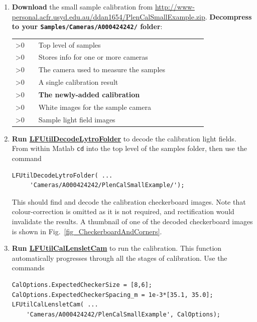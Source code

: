 \documentclass[onecolumn]{article}
\makeatletter
\newcommand{\Repeat}[1]{%
    \expandafter\@Repeat\expandafter{\the\numexpr #1\relax}%
}
\def\@Repeat#1{%
    \ifnum#1>0
        \expandafter\@@Repeat\expandafter{\the\numexpr #1-1\expandafter\relax\expandafter}%
    \else
        \expandafter\@gobble
    \fi
}
\def\@@Repeat#1#2{%
    \@Repeat{#1}{#2}#2%
}
\newcommand{\CiteFunction}[1]{\hyperlink{#1}{\small #1}}
\newcommand{\NewAnnotatedTree}[1]{\vspace{1em}\noindent\begin{tabular}{*{#1}{p{0.1em}}cp{6.5cm}}}
\newcommand{\EndAnnotatedTree}{\end{tabular}\vspace{1em}}
\newcommand{\AnnotatedTreeEntry}[4]{\Repeat{#1}{&}\multicolumn{#2}{l}{\SymbolText{#3}} & \small #4}
\newcommand{\SymbolText}[1]{\texttt{\small #1}}
\makeatother
\begin{document}
\begin{enumerate}[leftmargin=1.5em,rightmargin=0.5cm]

\item \textbf{Download} the small sample calibration from \url{http://www-personal.acfr.usyd.edu.au/ddan1654/PlenCalSmallExample.zip}.  \textbf{Decompress to your \SymbolText{Samples/Cameras/A000424242/} folder}:

\NewAnnotatedTree{6}
\AnnotatedTreeEntry{0}{7}{Samples}{Top level of samples}\\
\AnnotatedTreeEntry{1}{6}{Cameras}{Stores info for one or more cameras}\\
\AnnotatedTreeEntry{2}{5}{A000424242}{The camera used to measure the samples}\\
\AnnotatedTreeEntry{3}{4}{CalZoomedOutFixedFoc}{A single calibration result}\\
\AnnotatedTreeEntry{3}{4}{\normalsize{PlenCalSmallExample}}{\textbf{The newly-added calibration}}\\
\AnnotatedTreeEntry{3}{4}{WhiteImages}{White images for the sample camera}\\
\AnnotatedTreeEntry{1}{6}{Images}{Sample light field images}\\
\EndAnnotatedTree

\item \textbf{Run \CiteFunction{LFUtilDecodeLytroFolder}} to decode the calibration light fields.  From within Matlab \SymbolText{cd} into the top level of the samples folder, then use the command
\begin{Verbatim}
LFUtilDecodeLytroFolder( ... 
     'Cameras/A000424242/PlenCalSmallExample/');
\end{Verbatim}

This should find and decode the calibration checkerboard images.  Note that colour-correction is omitted as it is not required, and rectification would invalidate the results.  A thumbnail of one of the decoded checkerboard images is shown in Fig.~\ref{fig_CheckerboardAndCorners}.

\item \textbf{Run \CiteFunction{LFUtilCalLensletCam}} to run the calibration. This function automatically progresses through all the stages of calibration. Use the commands
\begin{Verbatim}
CalOptions.ExpectedCheckerSize = [8,6];
CalOptions.ExpectedCheckerSpacing_m = 1e-3*[35.1, 35.0];
LFUtilCalLensletCam( ...
    'Cameras/A000424242/PlenCalSmallExample', CalOptions);
\end{Verbatim}


\end{enumerate}
\end{document}
